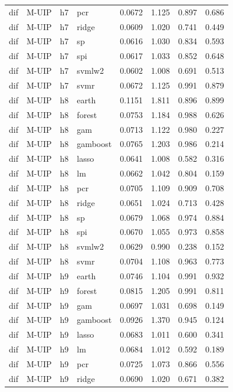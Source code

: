 \begin{ThreePartTable}
\begin{longtable}[t]{llclcccc}
dif & M-UIP & h7 & pcr & 0.0672 & 1.125 & 0.897 & 0.686\\
dif & M-UIP & h7 & ridge & 0.0609 & 1.020 & 0.741 & 0.449\\
dif & M-UIP & h7 & sp & 0.0616 & 1.030 & 0.834 & 0.593\\
dif & M-UIP & h7 & spi & 0.0617 & 1.033 & 0.852 & 0.648\\
dif & M-UIP & h7 & svmlw2 & 0.0602 & 1.008 & 0.691 & 0.513\\
dif & M-UIP & h7 & svmr & 0.0672 & 1.125 & 0.991 & 0.879\\
\addlinespace
dif & M-UIP & h8 & earth & 0.1151 & 1.811 & 0.896 & 0.899\\
dif & M-UIP & h8 & forest & 0.0753 & 1.184 & 0.988 & 0.626\\
dif & M-UIP & h8 & gam & 0.0713 & 1.122 & 0.980 & 0.227\\
dif & M-UIP & h8 & gamboost & 0.0765 & 1.203 & 0.986 & 0.214\\
dif & M-UIP & h8 & lasso & 0.0641 & 1.008 & 0.582 & 0.316\\
dif & M-UIP & h8 & lm & 0.0662 & 1.042 & 0.804 & 0.159\\
dif & M-UIP & h8 & pcr & 0.0705 & 1.109 & 0.909 & 0.708\\
dif & M-UIP & h8 & ridge & 0.0651 & 1.024 & 0.713 & 0.428\\
dif & M-UIP & h8 & sp & 0.0679 & 1.068 & 0.974 & 0.884\\
dif & M-UIP & h8 & spi & 0.0670 & 1.055 & 0.973 & 0.858\\
dif & M-UIP & h8 & svmlw2 & 0.0629 & 0.990 & 0.238 & 0.152\\
dif & M-UIP & h8 & svmr & 0.0704 & 1.108 & 0.963 & 0.773\\
\addlinespace
dif & M-UIP & h9 & earth & 0.0746 & 1.104 & 0.991 & 0.932\\
dif & M-UIP & h9 & forest & 0.0815 & 1.205 & 0.991 & 0.811\\
dif & M-UIP & h9 & gam & 0.0697 & 1.031 & 0.698 & 0.149\\
dif & M-UIP & h9 & gamboost & 0.0926 & 1.370 & 0.945 & 0.124\\
dif & M-UIP & h9 & lasso & 0.0683 & 1.011 & 0.600 & 0.341\\
dif & M-UIP & h9 & lm & 0.0684 & 1.012 & 0.592 & 0.189\\
dif & M-UIP & h9 & pcr & 0.0725 & 1.073 & 0.866 & 0.556\\
dif & M-UIP & h9 & ridge & 0.0690 & 1.020 & 0.671 & 0.382\\

\end{longtable}
\end{ThreePartTable}
